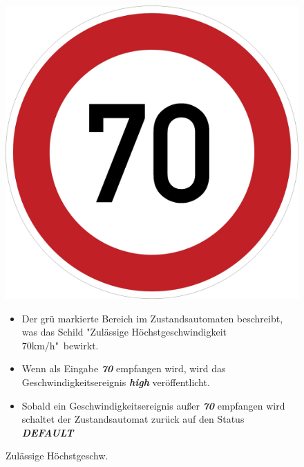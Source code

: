 \begin{figure}[h]
\begin{minipage}[t]{4cm}
\vspace{0pt}
\centering
\includegraphics[scale=0.06]{images/70.png}
\caption{Zul\"assige H\"ochstgeschw.}
\label{fig:PED}
\end{minipage}
\hfill
\begin{minipage}[t]{10cm}
\vspace{0pt}
\begin{itemize}
\item Der gr\"u markierte Bereich im Zustandsautomaten beschreibt, was das Schild "Zul\"assige H\"ochstgeschwindigkeit 70km/h"\ bewirkt.

\item Wenn als Eingabe \textbf{\textit{70}} empfangen wird, wird das Geschwindigkeitsereignis \textbf{\textit{high}} ver\"offentlicht.

\item Sobald ein Geschwindigkeitsereignis au\ss{}er \textbf{\textit{70}} empfangen wird schaltet der Zustandsautomat zur\"uck auf den Status \textbf{\textit{DEFAULT}}
\end{itemize}
\end{minipage}
\end{figure}